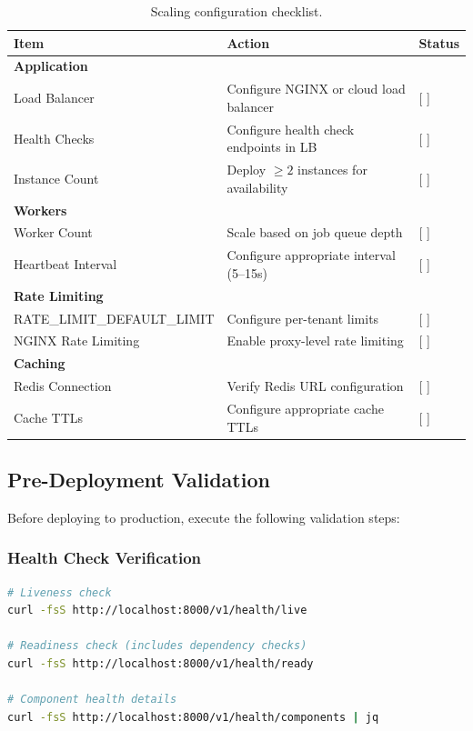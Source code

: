 \begin{table}[ht]
\centering
\caption{Scaling configuration checklist.}
\label{tab:scaling-checklist}
\small
\begin{tabularx}{\textwidth}{lXl}
\hline
\textbf{Item} & \textbf{Action} & \textbf{Status} \\
\hline
\multicolumn{3}{l}{\textbf{Application}} \\
Load Balancer & Configure NGINX or cloud load balancer & [ ] \\
Health Checks & Configure health check endpoints in LB & [ ] \\
Instance Count & Deploy $\geq 2$ instances for availability & [ ] \\
\hline
\multicolumn{3}{l}{\textbf{Workers}} \\
Worker Count & Scale based on job queue depth & [ ] \\
Heartbeat Interval & Configure appropriate interval (5--15s) & [ ] \\
\hline
\multicolumn{3}{l}{\textbf{Rate Limiting}} \\
RATE\_LIMIT\_DEFAULT\_LIMIT & Configure per-tenant limits & [ ] \\
NGINX Rate Limiting & Enable proxy-level rate limiting & [ ] \\
\hline
\multicolumn{3}{l}{\textbf{Caching}} \\
Redis Connection & Verify Redis URL configuration & [ ] \\
Cache TTLs & Configure appropriate cache TTLs & [ ] \\
\hline
\end{tabularx}
\end{table}

\subsection{Pre-Deployment Validation}

Before deploying to production, execute the following validation steps:

\subsubsection{Health Check Verification}

\begin{lstlisting}[language=bash, caption=Verify health endpoints]
# Liveness check
curl -fsS http://localhost:8000/v1/health/live

# Readiness check (includes dependency checks)
curl -fsS http://localhost:8000/v1/health/ready

# Component health details
curl -fsS http://localhost:8000/v1/health/components | jq
\end{lstlisting}

